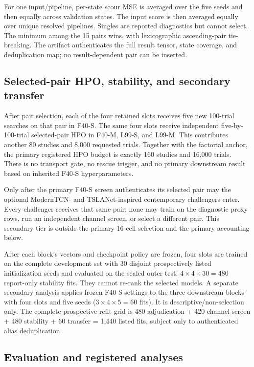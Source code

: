 For one input/pipeline, per-state scour MSE is averaged over the five seeds and
then equally across validation states. The input score is then averaged equally
over unique resolved pipelines. Singles are reported diagnostics but cannot
select. The minimum among the 15 pairs wins, with lexicographic ascending-pair
tie-breaking. The artifact authenticates the full result tensor, state
coverage, and deduplication map; no result-dependent pair can be inserted.

\subsection{Selected-pair HPO, stability, and secondary transfer}
\label{sec:post_selection}

After pair selection, each of the four retained slots receives five new
100-trial searches on that pair in F40-S. The same four slots receive
independent five-by-100-trial selected-pair HPO in F40-M, L99-S, and L99-M.
This contributes another 80 studies and 8,000 requested trials. Together with
the factorial anchor, the primary registered HPO budget is exactly 160 studies and
16,000 trials. There is no transport gate, no rescue trigger, and no primary
downstream result based on inherited F40-S hyperparameters.

Only after the primary F40-S screen authenticates its selected pair may the
optional ModernTCN- and TSLANet-inspired contemporary challengers enter. Every
challenger receives that same pair; none may train on the diagnostic proxy rows,
run an independent channel screen, or select a different pair. This secondary
tier is outside the primary 16-cell selection and the primary accounting below.

After each block's vectors and checkpoint policy are frozen, four slots are
trained on the complete development set with 30 disjoint prospectively listed
initialization seeds and evaluated on the sealed outer test: $4\times4\times
30=480$ report-only stability fits. They cannot re-rank the selected models.
A separate secondary analysis applies frozen F40-S settings to the three
downstream blocks with four slots and five seeds ($3\times4\times5=60$ fits).
It is descriptive/non-selection only. The complete prospective refit grid is
480 adjudication + 420 channel-screen + 480 stability + 60 transfer = 1,440
listed fits, subject only to authenticated alias deduplication.

\subsection{Evaluation and registered analyses}
\label{sec:metrics}

